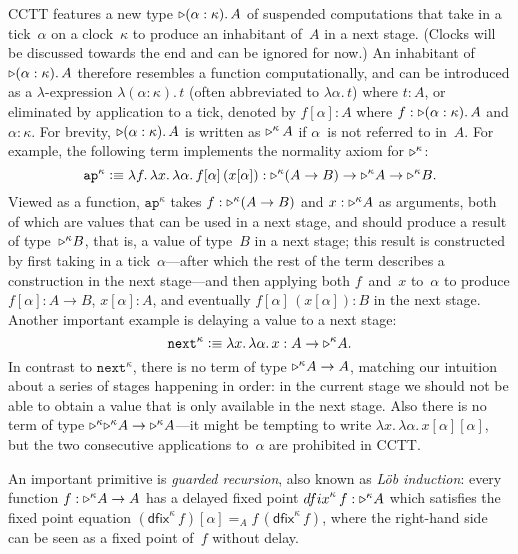 \documentclass[draft,a4paper,UKenglish,numberwithinsect,cleveref,thm-restate]{lipics-v2021}
\numberwithin{equation}{section}
\theoremstyle{definition}
\theoremstyle{plain}
\begin{document}
CCTT features a new type $\mathord{\triangleright} (\alpha : \kappa).\, A$ of suspended computations that take in a tick~$\alpha$ on a clock~$\kappa$ to produce an inhabitant of~$A$ in a next stage.
(Clocks will be discussed towards the end and can be ignored for now.)
An inhabitant of $\mathord{\triangleright} (\alpha : \kappa).\, A$ therefore resembles a function computationally, and can be introduced as a $\lambda$-expression $\lambda(\alpha : \kappa).\,t$ (often abbreviated to $\lambda\alpha.\,t$) where $t : A$, or eliminated by application to a tick, denoted by $f[\alpha] : A$ where $f : \mathord{\triangleright} (\alpha : \kappa).\, A$ and $\alpha : \kappa$.
For brevity, $\mathord{\triangleright} (\alpha : \kappa).\,A$ is written as $\mathord{\triangleright}^\kappa\, A$ if $\alpha$~is not referred to in~$A$.
For example, the following term implements the normality axiom for $\mathord{\triangleright}^\kappa$:
\[
  \mathtt{ap}^\kappa \vcentcolon\equiv \lambda f.\,\lambda x.\,\lambda \alpha.\, f[\alpha]\,(x[\alpha]) : \mathord{\triangleright}^\kappa(A \to B) \to \mathord{\triangleright}^\kappa A \to \mathord{\triangleright}^\kappa B.
\]
Viewed as a function, $\mathtt{ap}^\kappa$ takes $f : \mathord{\triangleright}^\kappa(A \to B)$ and $x : \mathord{\triangleright}^\kappa A$ as arguments, both of which are values that can be used in a next stage, and should produce a result of type~$\mathord{\triangleright}^\kappa B$, that is, a value of type~$B$ in a next stage; this result is constructed by first taking in a tick~$\alpha$---after which the rest of the term describes a construction in the next stage---and then applying both $f$~and~$x$ to~$\alpha$ to produce $f[\alpha] : A \to B$, $x[\alpha] : A$, and eventually $f[\alpha]\,(x[\alpha]) : B$ in the next stage.
Another important example is delaying a value to a next stage:
\[
  \mathtt{next}^\kappa \vcentcolon\equiv \lambda x.\,\lambda \alpha.\, x : A \to \mathord{\triangleright}^\kappa A.
\]
In contrast to $\mathtt{next}^\kappa$, there is no term of type $\mathord{\triangleright}^\kappa A \to A$, matching our intuition about a series of stages happening in order: in the current stage we should not be able to obtain a value that is only available in the next stage.
Also there is no term of type $\mathord{\triangleright}^\kappa \mathord{\triangleright}^\kappa A \to \mathord{\triangleright}^\kappa A$---it might be tempting to write $\lambda x.\, \lambda\alpha.\, x[\alpha][\alpha]$, but the two consecutive applications to~$\alpha$ are prohibited in CCTT.

An important primitive is \emph{guarded recursion}, also known as \emph{Löb induction}: every function $f : \mathord{\triangleright}^\kappa A \to A$ has a delayed fixed point $\mathsf{dfix}^\kappa\,f : \laterp^\kappa A$ which satisfies the fixed point equation $(\mathsf{dfix}^\kappa\,f)[\alpha] =_A f\,(\mathsf{dfix}^\kappa\,f)$, where the right-hand side can be seen as a fixed point of~$f$ without delay.
\end{document}
